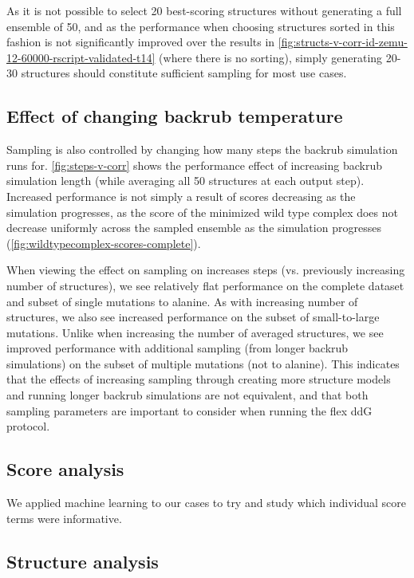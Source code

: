 As it is not possible to select 20 best-scoring structures without generating a full ensemble of 50, and as the performance when choosing structures sorted in this fashion is not significantly improved over the results in \cref{fig:structs-v-corr-id-zemu-12-60000-rscript-validated-t14} (where there is no sorting), simply generating 20-30 structures should constitute sufficient sampling for most use cases.

\subsection{Effect of changing backrub temperature}

Sampling is also controlled by changing how many steps the backrub simulation runs for.
\cref{fig:steps-v-corr} shows the performance effect of increasing backrub simulation length (while averaging all 50 structures at each output step).
Increased performance is not simply a result of scores decreasing as the simulation progresses, as the score of the minimized wild type complex does not decrease uniformly across the sampled ensemble as the simulation progresses (\cref{fig:wildtypecomplex-scores-complete}).

When viewing the effect on sampling on increases steps (vs. previously increasing number of structures), we see relatively flat performance on the complete dataset and subset of single mutations to alanine.
As with increasing number of structures, we also see increased performance on the subset of small-to-large mutations.
Unlike when increasing the number of averaged structures, we see improved performance with additional sampling (from longer backrub simulations) on the subset of multiple mutations (not to alanine). This indicates that the effects of increasing sampling through creating more structure models and running longer backrub simulations are not equivalent, and that both sampling parameters are important to consider when running the flex ddG protocol.

\subsection{Score analysis}

We applied machine learning to our cases to try and study which individual score terms were informative.

\subsection{Structure analysis}

